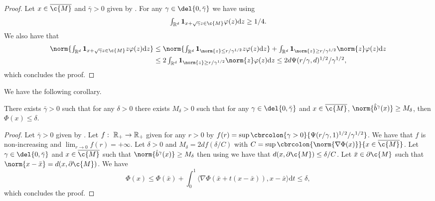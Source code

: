 \begin{proof}
	Let $x \in \cl{\c{M}}$ and $\bar{\gamma} >0$ given by .
	For any $\gamma \in \del{0, \bar{\gamma}}$ we have using  \begin{equation} \textstyle{\int_{\R^d} \bm{1}_{x + \sqrt{\gamma} z \in \c{M}} \varphi(z) \mathrm{d} z \geq 1/4 .
		}
	\end{equation}
	We also have that \begin{align} \textstyle{\norm{\int_{\R^d} \bm{1}_{x + \sqrt{\gamma} z \in \c{M}} z \varphi(z) \mathrm{d} z}} &\leq \textstyle{\norm{\int_{\R^d} \bm{1}_{\norm{z} \leq r/\gamma^{1/2}} z \varphi(z) \mathrm{d} z}} + \int_{\R^d} \bm{1}_{\norm{z} \geq r/\gamma^{1/2}} \norm{z} \varphi(z) \mathrm{d} z \\ &\leq \textstyle{2 \int_{\R^d} \bm{1}_{\norm{z} \geq r/\gamma^{1/2}} \norm{z} \varphi(z) \mathrm{d} z} \leq 2d \Psi(r/\gamma,d)^{1/2}/\gamma^{1/2} , \end{align} which concludes the proof.
\end{proof}

We have the following corollary.
\begin{corollary}
	\label{coro:condition_c}
	There exists $\bar{\gamma} >0$ such that for any $\delta >0$ there exists $M_\delta >0$ such that for any $\gamma \in \del{0, \bar{\gamma}}$ and $x \in \cl{\c{M}}$, $\norm{\hat{b}^\gamma(x)} \geq M_\delta$, then $\Phi(x) \leq \delta$.
\end{corollary}

\begin{proof}
	Let $\bar{\gamma} >0$ given by .
	Let $f: \ \mathbb{R}_+ \to \mathbb{R}_+$ given for any $r > 0$ by $f(r) = \sup \cbrcolon{\gamma > 0}{\Psi(r/\gamma,1)^{1/2}/\gamma^{1/2}}$.
	We have that $f$ is non-increasing and $\lim_{r \to 0} f(r)=+\infty$.
	Let $\delta > 0$ and $M_\delta =2df(\delta/C)$ with $C = \sup \cbrcolon{\norm{\nabla \Phi(x)}}{x \in \cl{\c{M}}}$.
	Let $\gamma \in \del{0, \bar{\gamma}}$ and $x \in \cl{\c{M}}$ such that $\norm{\hat{b}^\gamma(x)} \geq M_\delta$ then using  we have that $d(x, \partial \c{M}) \leq \delta / C$.
	Let $\bar{x} \in \partial \c{M}$ such that $\norm{x - \bar{x}} = d(x, \partial \c{M})$.
	We have \begin{equation} \textstyle{\Phi(x) \leq \Phi(\bar{x}) + \int_0^1 \langle \nabla \Phi(\bar{x} + t(x-\bar{x})), x - \bar{x} \rangle \mathrm{d} t \leq \delta,} \end{equation} which concludes the proof.
\end{proof}

